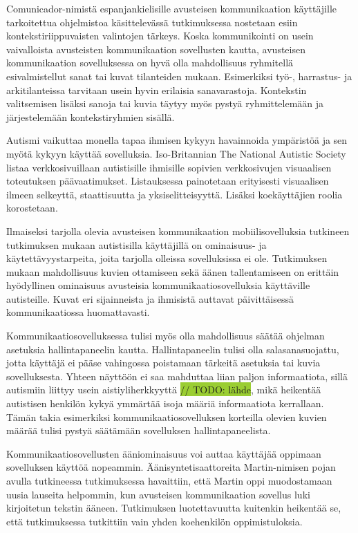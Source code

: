 \documentclass[utf8]{gradu3}
\begin{document}
\label{AAC-context-settings}
Comunicador-nimistä espanjankielisille avusteisen kommunikaation käyttäjille tarkoitettua ohjelmistoa käsittelevässä tutkimuksessa \parencite[]{graphic-communicator} nostetaan esiin kontekstiriippuvaisten valintojen tärkeys. Koska kommunikointi on usein vaivalloista avusteisten kommunikaation sovellusten kautta, avusteisen kommunikaation sovelluksessa on hyvä olla mahdollisuus ryhmitellä esivalmistellut sanat tai kuvat tilanteiden mukaan. Esimerkiksi työ-, harrastus- ja arkitilanteissa tarvitaan usein hyvin erilaisia sanavarastoja. Kontekstin valitsemisen lisäksi sanoja tai kuvia täytyy myös pystyä ryhmittelemään ja järjestelemään kontekstiryhmien sisällä.

\label{AAC-staticity}
Autismi vaikuttaa monella tapaa ihmisen kykyyn havainnoida ympäristöä ja sen myötä kykyyn käyttää sovelluksia. Iso-Britannian The National Autistic Society listaa verkkosivuillaan \parencite[]{autism-friendly-websites} autistisille ihmisille sopivien verkkosivujen visuaalisen toteutuksen päävaatimukset. Listauksessa painotetaan erityisesti visuaalisen ilmeen selkeyttä, staattisuutta ja yksiselitteisyyttä. Lisäksi koekäyttäjien roolia korostetaan.

Ilmaiseksi tarjolla olevia avusteisen kommunikaation mobiilisovelluksia tutkineen tutkimuksen \parencite[]{autism-mobile-usability} mukaan autistisilla käyttäjillä on ominaisuus- ja käytettävyystarpeita, joita tarjolla olleissa sovelluksissa ei ole. Tutkimuksen mukaan mahdollisuus kuvien ottamiseen sekä äänen tallentamiseen on erittäin hyödyllinen ominaisuus avusteisia kommunikaatiosovelluksia käyttäville autisteille. Kuvat eri sijainneista ja ihmisistä auttavat päivittäisessä kommunikaatiossa huomattavasti. \label{AAC-photos}

\label{AAC-settings}
Kommunikaatiosovelluksessa tulisi myös olla mahdollisuus säätää ohjelman asetuksia hallintapaneelin kautta. Hallintapaneelin tulisi olla salasanasuojattu, jotta käyttäjä ei pääse vahingossa poistamaan tärkeitä asetuksia tai kuvia sovelluksesta. Yhteen näyttöön ei saa mahduttaa liian paljon informaatiota, sillä autismiin liittyy usein aistiyliherkkyyttä \colorbox{YellowGreen}{// TODO: lähde}, mikä heikentää autistisen henkilön kykyä ymmärtää isoja määriä informaatiota kerrallaan. Tämän takia esimerkiksi kommunikaatiosovelluksen korteilla olevien kuvien määrää tulisi pystyä säätämään sovelluksen hallintapaneelista. \label{AAC-cardsize}

\label{AAC-soundsynth}
Kommunikaatiosovellusten ääniominaisuus voi auttaa käyttäjää oppimaan sovelluksen käyttöä nopeammin. Äänisyntetisaattoreita Martin-nimisen pojan avulla tutkineessa tutkimuksessa \parencite[]{voca-efficacy} havaittiin, että Martin oppi muodostamaan uusia lauseita helpommin, kun avusteisen kommunikaation sovellus luki kirjoitetun tekstin ääneen. Tutkimuksen luotettavuutta kuitenkin heikentää se, että tutkimuksessa tutkittiin vain yhden koehenkilön oppimistuloksia.
\end{document}

